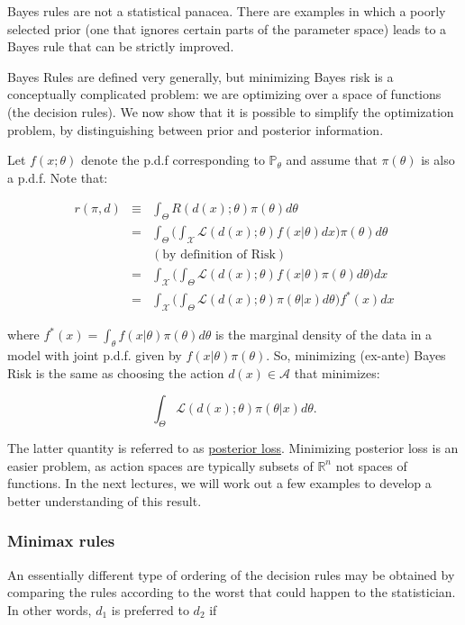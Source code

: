\documentclass[11pt]{article} %
\begin{document}
Bayes rules are not a statistical panacea. There are examples in which a poorly selected prior (one that ignores certain parts of the parameter space) leads to a Bayes rule that can be strictly improved. 

Bayes Rules are defined very generally, but minimizing Bayes risk is a conceptually complicated problem: we are optimizing over a space of functions (the decision rules). We now show that it is possible to simplify the optimization problem, by distinguishing between prior and posterior information. 

Let $f(x;\theta)$ denote the p.d.f corresponding to $\mathbb{P}_{\theta}$ and assume that $\pi(\theta)$ is also a p.d.f. Note that:

\begin{eqnarray*}
r(\pi, d) &\equiv& \int_{\Theta} R(d(x); \theta ) \pi(\theta) d{\theta} \\
&=&  \int_{\Theta}\Big( \int_{\mathcal{X}} \mathcal{L}(d(x); \theta) f(x| \theta) d x  \Big)  \pi(\theta) d{\theta} \\
&& (\textrm{by definition of Risk}) \\
&=& \int_{\mathcal{X}}   \Big( \int_{\Theta} \mathcal{L}(d(x); \theta) f(x| \theta) \pi(\theta) d \theta  \Big)   dx \\
&=& \int_{\mathcal{X}}   \Big( \int_{\Theta} \mathcal{L}(d(x); \theta)\pi (\theta | x) d \theta  \Big) f^*(x)  dx
\end{eqnarray*}

\noindent where $f^*(x)= \int_{\theta} f(x|\theta) \pi(\theta) d \theta$ is the marginal density of the data in a model with joint p.d.f. given by $f(x|\theta) \pi(\theta)$. So, minimizing (ex-ante) Bayes Risk is the same as choosing the action $d(x) \in \mathcal{A}$ that minimizes: 

\[ \int_{\Theta} \mathcal{L}(d(x); \theta)\pi (\theta | x) d \theta.  \] 

\noindent The latter quantity is referred to as \underline{posterior loss}. Minimizing posterior loss is an easier problem, as action spaces are typically subsets of $\mathbb{R}^{n}$ not spaces of functions. In the next lectures, we will work out a few examples to develop a better understanding of this result. 

\subsubsection{Minimax rules} 

An essentially different type of ordering of the decision rules may be obtained by comparing the rules according to the worst that could happen to the statistician. In other words, $d_1$ is preferred to $d_2$ if
\end{document}
